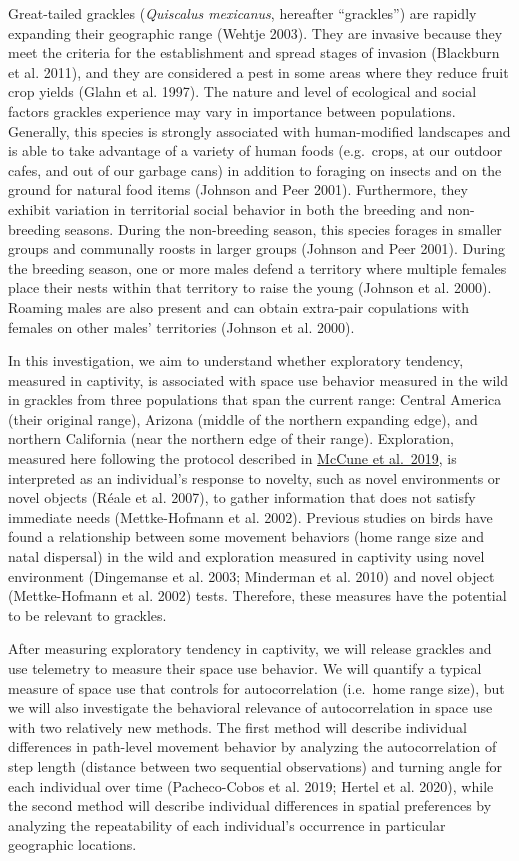\documentclass[
]{article}
\begin{document}
Great-tailed grackles (\emph{Quiscalus mexicanus}, hereafter
``grackles'') are rapidly expanding their geographic range (Wehtje
2003). They are invasive because they meet the criteria for the
establishment and spread stages of invasion (Blackburn et al. 2011), and
they are considered a pest in some areas where they reduce fruit crop
yields (Glahn et al. 1997). The nature and level of ecological and
social factors grackles experience may vary in importance between
populations. Generally, this species is strongly associated with
human-modified landscapes and is able to take advantage of a variety of
human foods (e.g.~crops, at our outdoor cafes, and out of our garbage
cans) in addition to foraging on insects and on the ground for natural
food items (Johnson and Peer 2001). Furthermore, they exhibit variation
in territorial social behavior in both the breeding and non-breeding
seasons. During the non-breeding season, this species forages in smaller
groups and communally roosts in larger groups (Johnson and Peer 2001).
During the breeding season, one or more males defend a territory where
multiple females place their nests within that territory to raise the
young (Johnson et al. 2000). Roaming males are also present and can
obtain extra-pair copulations with females on other males' territories
(Johnson et al. 2000).

In this investigation, we aim to understand whether exploratory
tendency, measured in captivity, is associated with space use behavior
measured in the wild in grackles from three populations that span the
current range: Central America (their original range), Arizona (middle
of the northern expanding edge), and northern California (near the
northern edge of their range). Exploration, measured here following the
protocol described in
\href{http://corinalogan.com/Preregistrations/g_exploration.html}{McCune
et al.~2019}, is interpreted as an individual's response to novelty,
such as novel environments or novel objects (Réale et al. 2007), to
gather information that does not satisfy immediate needs (Mettke-Hofmann
et al. 2002). Previous studies on birds have found a relationship
between some movement behaviors (home range size and natal dispersal) in
the wild and exploration measured in captivity using novel environment
(Dingemanse et al. 2003; Minderman et al. 2010) and novel object
(Mettke-Hofmann et al. 2002) tests. Therefore, these measures have the
potential to be relevant to grackles.

After measuring exploratory tendency in captivity, we will release
grackles and use telemetry to measure their space use behavior. We will
quantify a typical measure of space use that controls for
autocorrelation (i.e.~home range size), but we will also investigate the
behavioral relevance of autocorrelation in space use with two relatively
new methods. The first method will describe individual differences in
path-level movement behavior by analyzing the autocorrelation of step
length (distance between two sequential observations) and turning angle
for each individual over time (Pacheco-Cobos et al. 2019; Hertel et al.
2020), while the second method will describe individual differences in
spatial preferences by analyzing the repeatability of each individual's
occurrence in particular geographic locations.
\end{document}
